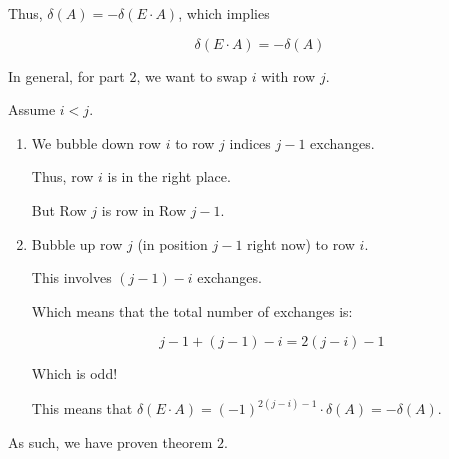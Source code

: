 {\begin{enumerate}[label=(Type: \roman*):, wide]
{				      Thus, \(\delta(A) = - \delta(E \cdot A)\), which implies

				      \[
					      \delta(E \cdot A) = - \delta(A)
				      \]
			      }
	\end{enumerate}

	In general, for part \(2\), we want to swap \(i\) with row \(j\).

	Assume \(i < j\).

	\begin{enumerate}[label=(\roman*), wide]
		\item We bubble down row \(i\) to row \(j\) indices \(j-1\) exchanges.

		      Thus, row \(i\) is in the right place.

		      But Row \(j\) is row in Row \(j - 1\).
		\item Bubble up row \(j\) (in position \(j -1\)  right now) to row \(i\).

		      This involves \((j - 1) - i\) exchanges.

		      Which means that the total number of exchanges is:

		      \[
			      j - 1 + (j - 1) - i = 2(j - i) - 1
		      \]

		      Which is odd!

		      This means that \(\delta(E \cdot A) = (-1)^{2(j - i) - 1} \cdot \delta(A) = - \delta(A)\).
	\end{enumerate}


	As such, we have proven theorem \(2\).
}

